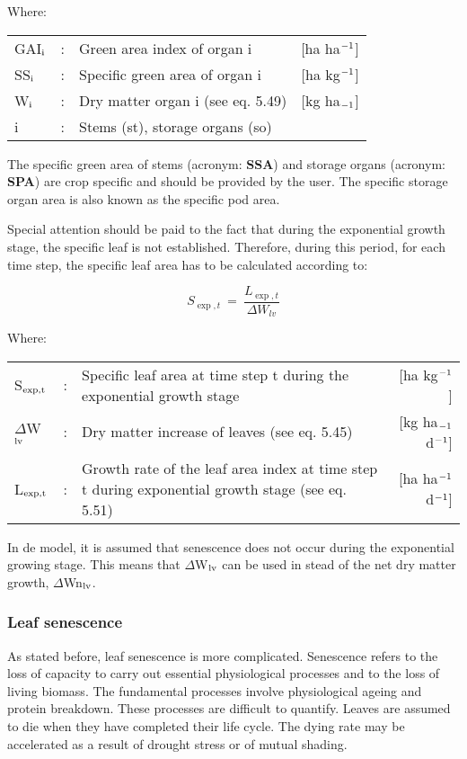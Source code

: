 Where:\\[5pt]
\begin{tabularx}{\textwidth}{llXr}
GAI$_{{\rm i}}$ &:& Green area index of organ i    &
    [ha ha$^{{\rm -1}}$]\\
SS$_{{\rm i}}$ &:& Specific green area of organ i    &
    [ha kg$^{{\rm -1}}$]\\
W$_{{\rm i}}$ &:& Dry matter organ i (see eq. 5.49)    &
    [kg ha$_{{\rm -1}}$]\\
i &:& Stems (st), storage organs (so)\\
\end{tabularx}

The specific green area of stems (acronym: {\bf SSA}) and storage organs (acronym: {\bf SPA}) are
crop specific and should be provided by the user. The specific storage organ area is also
known as the specific pod area.

Special attention should be paid to the fact that during the exponential growth stage, the
specific leaf is not established. Therefore, during this period, for each time step, the
specific leaf area has to be calculated according to:

\begin{equation}
S_{\exp,t} ~=~ {\frac{L_{\exp,t}}{\Delta W_{lv} }}
\end{equation}

Where:\\[5pt]
\begin{tabularx}{\textwidth}{llXr}
S$_{{\rm exp,t}}$ &:& Specific leaf area at time step t during the 
    exponential growth stage    &     [ha kg$^{{\rm -1}}$]\\
$\Delta$W$_{{\rm lv}}$ &:& Dry matter increase of leaves (see eq. 5.45)   &
    [kg ha$_{{\rm -1}}$ d$^{{\rm -1}}$]\\
L$_{{\rm \exp,t}}$ &:& Growth rate of the leaf area index at time step t
   during exponential growth stage (see eq. 5.51)   &
        [ha ha$^{{\rm -1}}$ d$^{{\rm -1}}$]\\
\end{tabularx}

 
In de model, it is assumed that senescence does not occur during the exponential growing
stage. This means that $\Delta$W$_{{\rm lv}}$ can be used in stead of the net dry matter growth, $\Delta$Wn$_{{\rm lv}}$.

\subsubsection{Leaf senescence}
As stated before, leaf senescence is more complicated. Senescence refers to the loss of
capacity to carry out essential physiological processes and to the loss of living biomass.
The fundamental processes involve physiological ageing and protein breakdown. These
processes are difficult to quantify. Leaves are assumed to die when they have completed
their life cycle. The dying rate may be accelerated as a result of drought stress or of
mutual shading.

